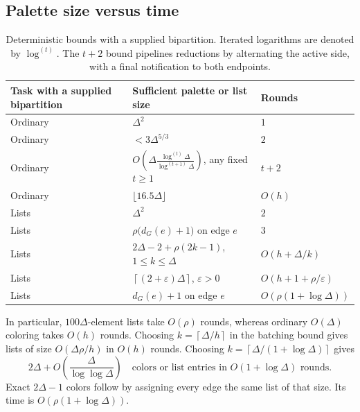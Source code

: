 \documentclass[11pt]{article}
\theoremstyle{definition}
\theoremstyle{remark}
\newcommand{\eps}{\varepsilon}
\newcommand{\ceil}[1]{\left\lceil #1\right\rceil}
\begin{document}
\subsection{Palette size versus time}
\begin{table}[htbp]
\centering\small
\begin{tabularx}{\linewidth}{@{}lXl@{}}
\toprule
Task with a supplied bipartition & Sufficient palette or list size & Rounds\\
\midrule
Ordinary & $\Delta^2$ & $1$\\
Ordinary & $<3\Delta^{5/3}$ & $2$\\
Ordinary & $O\!\left(\Delta\frac{\log^{(t)}\Delta}{\log^{(t+1)}\Delta}\right)$,
 any fixed $t\ge1$ & $t+2$\\
Ordinary & $\lfloor16.5\Delta\rfloor$ & $O(h)$\\
Lists & $\Delta^2$ & $2$\\
Lists & $\rho\bigl(d_G(e)+1\bigr)$ on edge $e$ & $3$\\
Lists & $2\Delta-2+\rho(2k-1)$, $1\le k\le\Delta$ & $O(h+\Delta/k)$\\
Lists & $\ceil{(2+\eps)\Delta}$, $\eps>0$ & $O(h+1+\rho/\eps)$\\
Lists & $d_G(e)+1$ on edge $e$ & $O(\rho(1+\log\Delta))$\\
\bottomrule
\end{tabularx}
\caption{Deterministic bounds with a supplied bipartition. Iterated logarithms
are denoted by $\log^{(t)}$. The $t+2$ bound pipelines reductions by alternating
the active side, with a final notification to both endpoints.}
\label{tab:bipartite}
\end{table}

In particular, $100\Delta$-element lists take $O(\rho)$ rounds, whereas
ordinary $O(\Delta)$ coloring takes $O(h)$ rounds. Choosing
$k=\ceil{\Delta/h}$ in the batching bound gives lists of size
$O(\Delta\rho/h)$ in $O(h)$ rounds. Choosing
$k=\ceil{\Delta/(1+\log\Delta)}$ gives
\begin{equation}\label{eq:neartwo}
 2\Delta+O\!\left(\frac{\Delta}{\log\log\Delta}\right)
 \quad\text{colors or list entries in }O(1+\log\Delta)\text{ rounds}.
\end{equation}
Exact $2\Delta-1$ colors follow by assigning every edge the same list of
that size. Its time is $O(\rho(1+\log\Delta))$.
\end{document}
